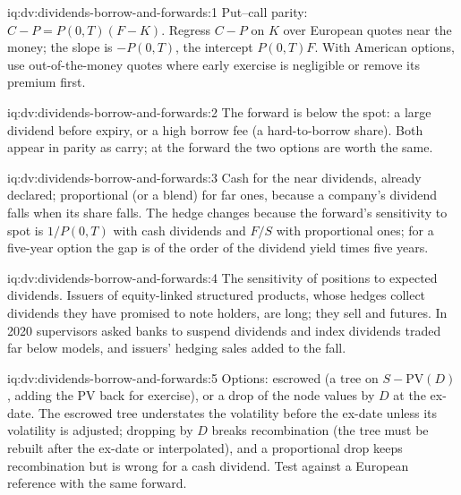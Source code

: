 \begin{solution}{iq:dv:dividends-borrow-and-forwards:1}
Put--call parity: $C-P=P(0,T)(F-K)$. Regress $C-P$ on $K$ over European quotes near the
money; the slope is $-P(0,T)$, the intercept $P(0,T)F$. With American options, use
out-of-the-money quotes where early exercise is negligible or remove its premium first.
\end{solution}

\begin{solution}{iq:dv:dividends-borrow-and-forwards:2}
The forward is below the spot: a large dividend before expiry, or a high borrow fee (a
hard-to-borrow share). Both appear in parity as carry; at the forward the two options are
worth the same.
\end{solution}

\begin{solution}{iq:dv:dividends-borrow-and-forwards:3}
Cash for the near dividends, already declared; proportional (or a blend) for far ones,
because a company's dividend falls when its share falls. The hedge changes because the
forward's sensitivity to spot is $1/P(0,T)$ with cash dividends and $F/S$ with
proportional ones; for a five-year option the gap is of the order of the dividend yield
times five years.
\end{solution}

\begin{solution}{iq:dv:dividends-borrow-and-forwards:4}
The sensitivity of positions to expected dividends. Issuers of equity-linked
structured products, whose hedges collect dividends they have promised to note holders,
are long; they sell  and futures. In 2020 supervisors asked banks to suspend
dividends and index dividends traded far below models, and issuers' hedging sales added
to the fall.
\end{solution}

\begin{solution}{iq:dv:dividends-borrow-and-forwards:5}
Options: escrowed (a tree on $S-\mathrm{PV}(D)$, adding the PV back for exercise), or a
drop of the node values by $D$ at the ex-date. The escrowed tree understates the
volatility before the ex-date unless its volatility is adjusted; dropping by $D$ breaks
recombination (the tree must be rebuilt after the ex-date or interpolated), and a
proportional drop keeps recombination but is wrong for a cash dividend. Test against a
European reference with the same forward.
\end{solution}

